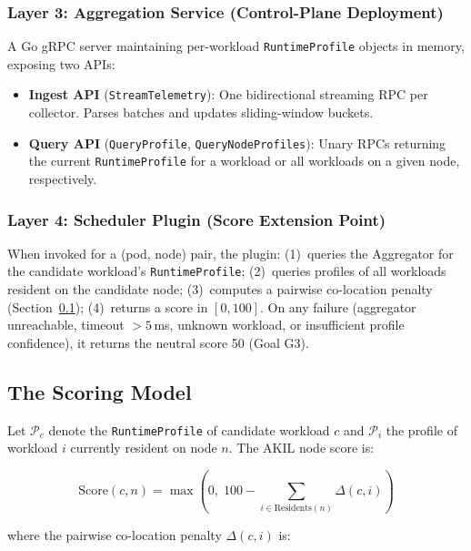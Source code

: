 \documentclass[10pt,conference,a4paper]{IEEEtran}
\begin{document}
\subsubsection{Layer 3: Aggregation Service (Control-Plane Deployment)}

A Go gRPC server maintaining per-workload \texttt{RuntimeProfile} objects in memory,
exposing two APIs:

\begin{itemize}[leftmargin=*,topsep=1pt,itemsep=1pt]
  \item \textbf{Ingest API} (\texttt{StreamTelemetry}): One bidirectional streaming
        RPC per collector. Parses batches and updates sliding-window buckets.
  \item \textbf{Query API} (\texttt{QueryProfile}, \texttt{QueryNodeProfiles}):
        Unary RPCs returning the current \texttt{RuntimeProfile} for a workload
        or all workloads on a given node, respectively.
\end{itemize}

\subsubsection{Layer 4: Scheduler Plugin (Score Extension Point)}

When invoked for a (pod, node) pair, the plugin:
(1)~queries the Aggregator for the candidate workload's \texttt{RuntimeProfile};
(2)~queries profiles of all workloads resident on the candidate node;
(3)~computes a pairwise co-location penalty (Section~\ref{sec:scoring});
(4)~returns a score in $[0, 100]$.
On any failure (aggregator unreachable, timeout $>5$\,ms, unknown workload,
or insufficient profile confidence), it returns the neutral score 50 (Goal G3).

\subsection{The Scoring Model}
\label{sec:scoring}

Let $\mathcal{P}_c$ denote the \texttt{RuntimeProfile} of candidate workload $c$ and
$\mathcal{P}_i$ the profile of workload $i$ currently resident on node $n$.
The AKIL node score is:

\begin{equation}
\text{Score}(c, n) = \max\!\left(0,\;100 - \!\!\sum_{i \in \text{Residents}(n)}
  \!\!\Delta(c, i)\right)
\label{eq:score}
\end{equation}

\noindent where the pairwise co-location penalty $\Delta(c, i)$ is:
\end{document}
